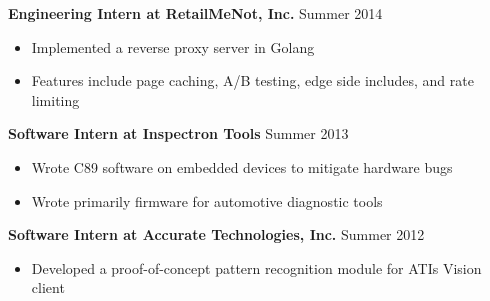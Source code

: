 \documentclass[line,margin]{res}
\begin{document}
\begin{resume}
                {\sc \textbf{Engineering Intern at RetailMeNot, Inc.}} \hfill Summer 2014
                 \begin{itemize}  \itemsep -2pt %
                 \item Implemented a reverse proxy server in Golang
                 \item Features include page caching, A/B testing, edge side includes, and rate limiting
                 \end{itemize}

                {\sc \textbf{Software Intern at Inspectron Tools}} \hfill Summer 2013
                 \begin{itemize}  \itemsep -2pt %
                 \item Wrote C89 software on embedded devices to mitigate hardware bugs
                 \item Wrote primarily firmware for automotive diagnostic tools
                 \end{itemize}

                {\sc \textbf{Software Intern at Accurate Technologies, Inc.}} \hfill            Summer 2012
                 \begin{itemize}  \itemsep -2pt %
                 \item Developed a proof-of-concept pattern recognition module for ATI\textquotesingle s Vision client
                 \end{itemize}


\end{resume}
\end{document}
